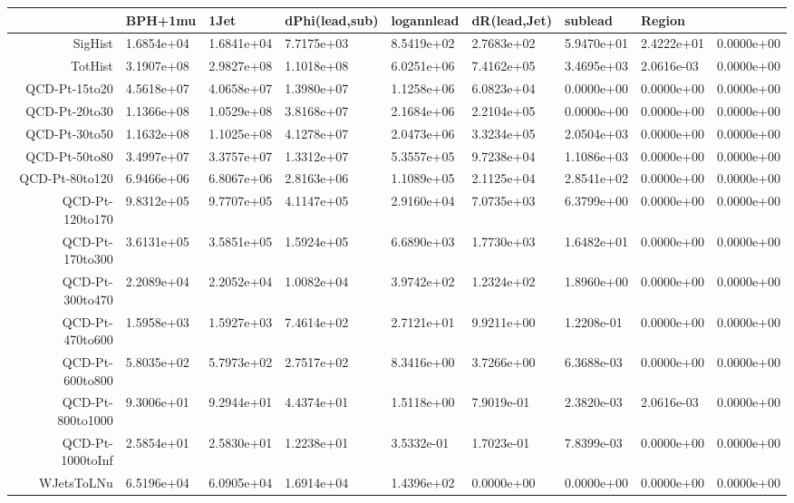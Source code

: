 \documentclass{article}
\begin{document}
\begin{adjustbox}{angle=90}

\begin{tabular}{rllllllll}

 \hline 
&BPH+1mu & 1Jet & dPhi(lead,sub) & logannlead & dR(lead,Jet) & sublead & Region & \\
 \hline 
 \hline 
SigHist&1.6854e+04&1.6841e+04&7.7175e+03&8.5419e+02&2.7683e+02&5.9470e+01&2.4222e+01&0.0000e+00 \\
 \hline 
TotHist&3.1907e+08&2.9827e+08&1.1018e+08&6.0251e+06&7.4162e+05&3.4695e+03&2.0616e-03&0.0000e+00 \\
 \hline 
QCD-Pt-15to20&4.5618e+07&4.0658e+07&1.3980e+07&1.1258e+06&6.0823e+04&0.0000e+00&0.0000e+00&0.0000e+00 \\
 \hline 
QCD-Pt-20to30&1.1366e+08&1.0529e+08&3.8168e+07&2.1684e+06&2.2104e+05&0.0000e+00&0.0000e+00&0.0000e+00 \\
 \hline 
QCD-Pt-30to50&1.1632e+08&1.1025e+08&4.1278e+07&2.0473e+06&3.3234e+05&2.0504e+03&0.0000e+00&0.0000e+00 \\
 \hline 
QCD-Pt-50to80&3.4997e+07&3.3757e+07&1.3312e+07&5.3557e+05&9.7238e+04&1.1086e+03&0.0000e+00&0.0000e+00 \\
 \hline 
QCD-Pt-80to120&6.9466e+06&6.8067e+06&2.8163e+06&1.1089e+05&2.1125e+04&2.8541e+02&0.0000e+00&0.0000e+00 \\
 \hline 
QCD-Pt-120to170&9.8312e+05&9.7707e+05&4.1147e+05&2.9160e+04&7.0735e+03&6.3799e+00&0.0000e+00&0.0000e+00 \\
 \hline 
QCD-Pt-170to300&3.6131e+05&3.5851e+05&1.5924e+05&6.6890e+03&1.7730e+03&1.6482e+01&0.0000e+00&0.0000e+00 \\
 \hline 
QCD-Pt-300to470&2.2089e+04&2.2052e+04&1.0082e+04&3.9742e+02&1.2324e+02&1.8960e+00&0.0000e+00&0.0000e+00 \\
 \hline 
QCD-Pt-470to600&1.5958e+03&1.5927e+03&7.4614e+02&2.7121e+01&9.9211e+00&1.2208e-01&0.0000e+00&0.0000e+00 \\
 \hline 
QCD-Pt-600to800&5.8035e+02&5.7973e+02&2.7517e+02&8.3416e+00&3.7266e+00&6.3688e-03&0.0000e+00&0.0000e+00 \\
 \hline 
QCD-Pt-800to1000&9.3006e+01&9.2944e+01&4.4374e+01&1.5118e+00&7.9019e-01&2.3820e-03&2.0616e-03&0.0000e+00 \\
 \hline 
QCD-Pt-1000toInf&2.5854e+01&2.5830e+01&1.2238e+01&3.5332e-01&1.7023e-01&7.8399e-03&0.0000e+00&0.0000e+00 \\
 \hline 
WJetsToLNu&6.5196e+04&6.0905e+04&1.6914e+04&1.4396e+02&0.0000e+00&0.0000e+00&0.0000e+00&0.0000e+00 \\

\end{tabular}
\end{adjustbox}
\end{document}
